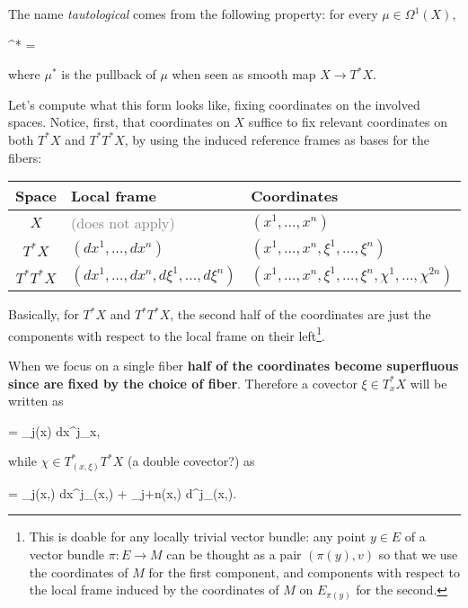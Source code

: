 \documentclass[main.tex]{subfiles}
\begin{document}
The name \emph{tautological} comes from the following property: for every $\mu \in \Omega^1(X)$,
\begin{eqalign}
	\mu^* \alpha = \mu
\end{eqalign}
where $\mu^*$ is the pullback of $\mu$ when seen as smooth map $X \to T^*X$.

Let's compute what this form looks like, fixing coordinates on the involved spaces. Notice, first, that coordinates on $X$ suffice to fix relevant coordinates on both $T^*X$ and $T^*T^*X$, by using the induced reference frames as bases for the fibers:

\begin{center}
	\begin{tabular}{c|l|l}
		\textbf{Space} & \textbf{Local frame} & \textbf{Coordinates}\\[1ex]
		\hline
		$X$ & \textcolor{gray}{(does not apply)} & $(x^1, \ldots, x^n)$\\[1ex]
		$T^*X$ & $(dx^1, \ldots, dx^n)$ & $(x^1, \ldots, x^n, \xi^1, \ldots, \xi^n)$\\[1ex]
		$T^*T^*X$ & $(dx^1, \ldots, dx^n, d\xi^1, \ldots, d\xi^n)$ & $(x^1, \ldots, x^n, \xi^1, \ldots, \xi^n, \chi^1, \ldots, \chi^{2n})$\\
	\end{tabular}
\end{center}

Basically, for $T^*X$ and $T^*T^*X$, the second half of the coordinates are just the components with respect to the local frame on their left\footnote{This is doable for any locally trivial vector bundle: any point $y \in E$ of a vector bundle $\pi: E \to M$ can be thought as a pair $(\pi(y), v)$ so that we use the coordinates of $M$ for the first component, and components with respect to the local frame induced by the coordinates of $M$ on $E_{\pi(y)}$ for the second.}.

When we focus on a single fiber \textbf{half of the coordinates become superfluous since are fixed by the choice of fiber}. Therefore a covector $\xi \in T^*_x X$ will be written as
\begin{eqalign}
	\xi = \xi_j(x) dx^j\vert_x,
\end{eqalign}
while $\chi \in T^*_{(x,\xi)} T^*X$ (a double covector?) as
\begin{eqalign}
	\chi = \chi_j(x,\xi) dx^j\vert_{(x,\xi)} + \chi_{j+n}(x,\xi) d\xi^j\vert_{(x,\xi)}.
\end{eqalign}
\end{document}
